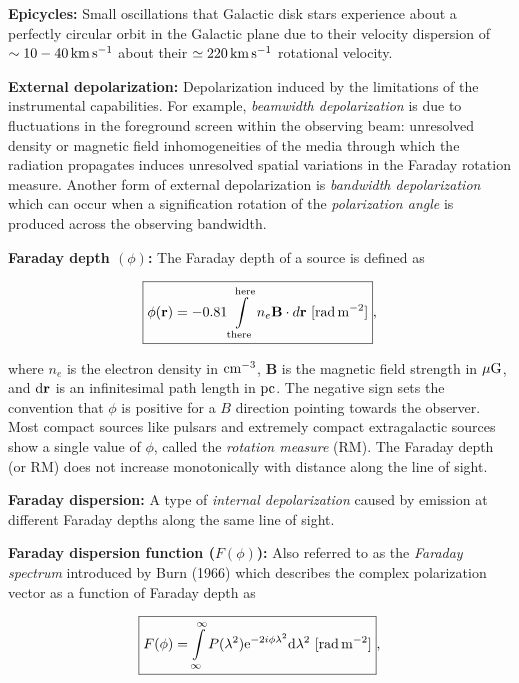 \documentclass[a4paper,11pt]{article}
\begin{document}
{\noindent}\textbf{Epicycles:} Small oscillations that Galactic disk stars experience about a perfectly circular orbit in the Galactic plane due to their velocity dispersion of $\sim10-40\,{\rm km\,s^{-1}}$ about their $\simeq220\,{\rm km\,s^{-1}}$ rotational velocity.

{\noindent}\textbf{External depolarization:} Depolarization induced by the limitations of the instrumental capabilities. For example, \textit{beamwidth depolarization} is due to fluctuations in the foreground screen within the observing beam: unresolved density or magnetic field inhomogeneities of the media through which the radiation propagates induces unresolved spatial variations in the Faraday rotation measure. Another form of external depolarization is \textit{bandwidth depolarization} which can occur when a signification rotation of the \textit{polarization angle} is produced across the observing bandwidth.

{\noindent}\textbf{Faraday depth $(\phi)$:} The Faraday depth of a source is defined as

\begin{align*}
    \boxed{\phi(\mathbf{r}) = -0.81 \int\limits_\mathrm{there}^\mathrm{here}n_e\mathbf{B}\cdot d\mathbf{r} ~ [{\rm rad\,m^{-2}}]},
\end{align*}

{\noindent}where $n_e$ is the electron density in ${\rm cm^{-3}}$, $\mathbf{B}$ is the magnetic field strength in $\mu{\rm G}$, and ${\rm d\mathbf{r}}$ is an infinitesimal path length in ${\rm pc}$. The negative sign sets the convention that $\phi$ is positive for a $B$ direction pointing towards the observer. Most compact sources like pulsars and extremely compact extragalactic sources show a single value of $\phi$, called the \textit{rotation measure} (RM). The Faraday depth (or RM) does not increase monotonically with distance along the line of sight.

{\noindent}\textbf{Faraday dispersion:} A type of \textit{internal depolarization} caused by emission at different Faraday depths along the same line of sight.

{\noindent}\textbf{Faraday dispersion function ($F(\phi)$):} Also referred to as the \textit{Faraday spectrum} introduced by Burn (1966) which describes the complex polarization vector as a function of Faraday depth as

\begin{align*}
    \boxed{F(\phi) = \int\limits_{\infty}^\infty P(\lambda^2)\mathrm{e}^{-2i\phi\lambda^2}\mathrm{d}\lambda^2 ~ [{\rm rad\,m^{-2}}]},
\end{align*}
\end{document}
